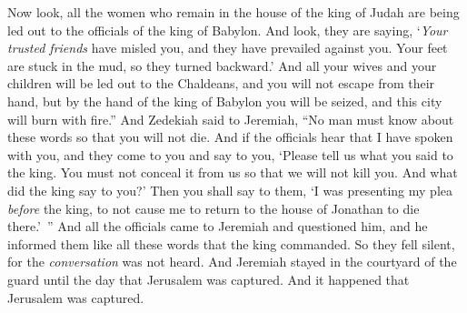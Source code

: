 \begin{biblechapter}
\verse Now look, all the women who remain in the house of the king of Judah are being led out to the officials of the king of Babylon. And look, they are saying, ‘\textit{Your trusted friends} have misled you, 
and they have prevailed against you. 
Your feet are stuck in the mud, 
so they turned backward.’
\verse And all your wives and your children will be led out to the Chaldeans, and you will not escape from their hand, but by the hand of the king of Babylon you will be seized, and this city will burn with fire.”
\verse And Zedekiah said to Jeremiah, “No man must know about these words so that you will not die.
\verse And if the officials hear that I have spoken with you, and they come to you and say to you, ‘Please tell us what you said to the king. You must not conceal it from us so that we will not kill you. And what did the king say to you?’
\verse Then you shall say to them, ‘I was presenting my plea \textit{before} the king, to not cause me to return to the house of Jonathan to die there.’ ”
\verse And all the officials came to Jeremiah and questioned him, and he informed them like all these words that the king commanded. So they fell silent, for the \textit{conversation} was not heard.
\verse And Jeremiah stayed in the courtyard of the guard until the day that Jerusalem was captured. And it happened that Jerusalem was captured.
\end{biblechapter}

